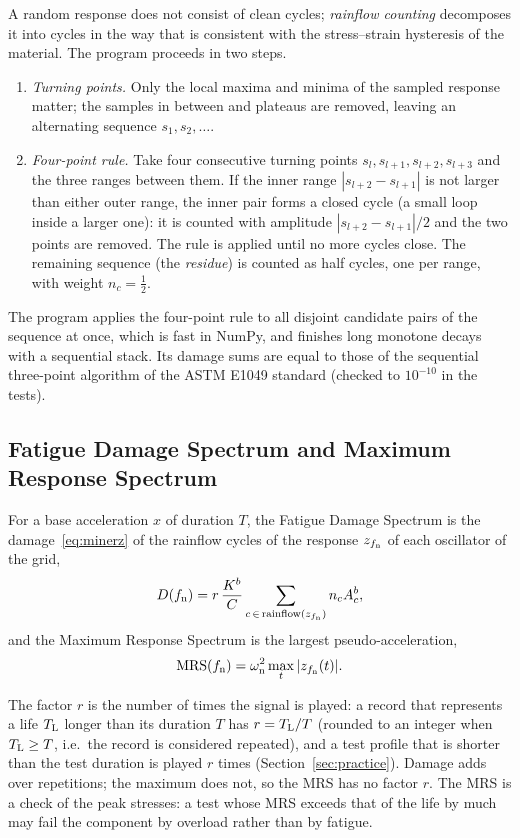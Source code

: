 A random response does not consist of clean cycles; \emph{rainflow counting} decomposes it into
cycles in the way that is consistent with the stress--strain hysteresis of the material. The program
proceeds in two steps.
\begin{enumerate}[nosep]
\item \emph{Turning points.} Only the local maxima and minima of the sampled response matter; the
samples in between and plateaus are removed, leaving an alternating sequence $s_1, s_2, \dots$.
\item \emph{Four-point rule.} Take four consecutive turning points $s_{l}, s_{l+1}, s_{l+2},
s_{l+3}$ and the three ranges between them. If the inner range $|s_{l+2}-s_{l+1}|$ is not larger than
either outer range, the inner pair forms a closed cycle (a small loop inside a larger one): it is
counted with amplitude $|s_{l+2}-s_{l+1}|/2$ and the two points are removed. The rule is applied until
no more cycles close. The remaining sequence (the \emph{residue}) is counted as half cycles, one per
range, with weight $n_c = \tfrac12$.
\end{enumerate}
The program applies the four-point rule to all disjoint candidate pairs of the sequence at once, which
is fast in NumPy, and finishes long monotone decays with a sequential stack. Its damage sums are equal
to those of the sequential three-point algorithm of the ASTM E1049 standard (checked to $10^{-10}$ in
the tests).

\subsection{Fatigue Damage Spectrum and Maximum Response Spectrum}\label{sec:fds}

\begin{result}
For a base acceleration $x$ of duration $T$, the Fatigue Damage Spectrum is the damage~\eqref{eq:minerz}
of the rainflow cycles of the response $z_{f_{\mathrm{n}}}$ of each oscillator of the grid,
\begin{equation}\label{eq:fds}
  D(f_{\mathrm{n}}) = r\,\frac{K^b}{C}\sum_{c\,\in\,\mathrm{rainflow}(z_{f_{\mathrm{n}}})} n_c A_c^b ,
\end{equation}
and the Maximum Response Spectrum is the largest pseudo-acceleration,
\begin{equation}
  \mathrm{MRS}(f_{\mathrm{n}}) = \omega_{\mathrm{n}}^2\max_t|z_{f_{\mathrm{n}}}(t)|.
\end{equation}
\end{result}
The factor $r$ is the number of times the signal is played: a record that represents a life
$T_{\mathrm{L}}$ longer than its duration $T$ has $r = T_{\mathrm{L}}/T$ (rounded to an integer when $T_{\mathrm{L}}\ge T$, i.e.\ the
record is considered repeated), and a test profile that is shorter than the test duration is played $r$
times (Section~\ref{sec:practice}). Damage adds over repetitions; the maximum does not, so the MRS has
no factor $r$. The MRS is a check of the peak stresses: a test whose MRS exceeds that of the life by
much may fail the component by overload rather than by fatigue.

